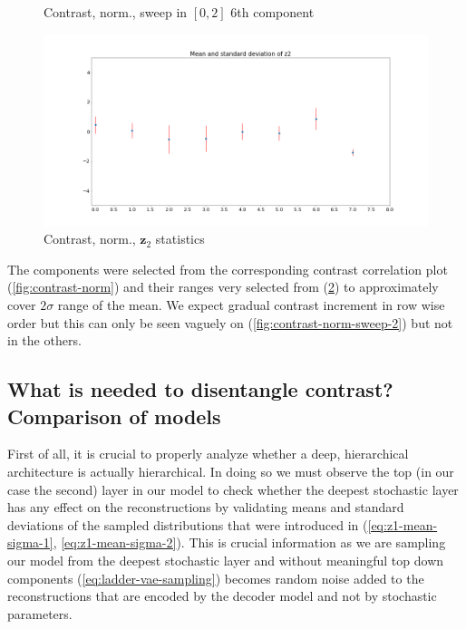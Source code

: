 \documentclass[12pt, english]{article}
\begin{document}
\begin{figure}[H]
\begin{minipage}[b]{0.5\linewidth}
    \caption{Contrast, norm., sweep in $[0, 2]$ \newline $6$th component} 
    \label{fig:contrast-norm-sweep-6}
  \end{minipage}
\end{figure}

\begin{figure}[H]
    \centering
    \includegraphics[width=.85\linewidth]{sweep/norm_contrast_z2_stats.png} 
    \caption{Contrast, norm., $\bm{z}_2$ statistics} 
    \label{fig:contrast-norm-stats}
\end{figure}

\vspace{4mm}

\par The components were selected from the corresponding contrast correlation plot (\ref{fig:contrast-norm}) and their ranges very selected from (\ref{fig:contrast-norm-stats}) to approximately cover $2\sigma$ range of the mean. We expect gradual contrast increment in row wise order but this can only be seen vaguely on (\ref{fig:contrast-norm-sweep-2}) but not in the others.

\newpage

\subsection{What is needed to disentangle contrast? Comparison of models}

\vspace{5mm}

\par First of all, it is crucial to properly analyze whether a deep, hierarchical architecture is actually hierarchical. In doing so we must observe the top (in our case the second) layer in our model to check whether the deepest stochastic layer has any effect on the reconstructions by validating means and standard deviations of the sampled distributions that were introduced in (\ref{eq:z1-mean-sigma-1}, \ref{eq:z1-mean-sigma-2}). This is crucial information as we are sampling our model from the deepest stochastic layer and without meaningful top down components (\ref{eq:ladder-vae-sampling}) becomes random noise added to the reconstructions that are encoded by the decoder model and not by stochastic parameters.
\end{document}
